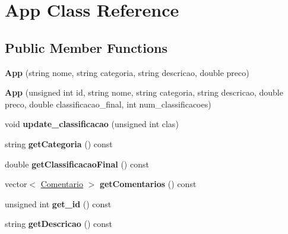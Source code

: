 \hypertarget{class_app}{\section{App Class Reference}
\label{class_app}
}
\subsection*{Public Member Functions}
\begin{DoxyCompactItemize}
\item 
\hypertarget{class_app_ae491b91a0a622aa5f78559403b83e0df}{{\bfseries App} (string nome, string categoria, string descricao, double preco)}\label{class_app_ae491b91a0a622aa5f78559403b83e0df}

\item 
\hypertarget{class_app_a77f4deed2edae59b74f5aca757c1368a}{{\bfseries App} (unsigned int id, string nome, string categoria, string descricao, double preco, double classificacao\+\_\+final, int num\+\_\+classificacoes)}\label{class_app_a77f4deed2edae59b74f5aca757c1368a}

\item 
\hypertarget{class_app_ac720715c2e11bfc218842141b9c6e0d2}{void {\bfseries update\+\_\+classificacao} (unsigned int clas)}\label{class_app_ac720715c2e11bfc218842141b9c6e0d2}

\item 
\hypertarget{class_app_a58076d5e40336d8f1489f49ebcc648ac}{string {\bfseries get\+Categoria} () const }\label{class_app_a58076d5e40336d8f1489f49ebcc648ac}

\item 
\hypertarget{class_app_a99b0df2b556e0d0967af13f37b47178e}{double {\bfseries get\+Classificacao\+Final} () const }\label{class_app_a99b0df2b556e0d0967af13f37b47178e}

\item 
\hypertarget{class_app_a55940da54fefa49300678f6ce87eeb04}{vector$<$ \hyperlink{class_comentario}{Comentario} $>$ {\bfseries get\+Comentarios} () const }\label{class_app_a55940da54fefa49300678f6ce87eeb04}

\item 
\hypertarget{class_app_a5618097d1b98a8482e3b179139d9b8be}{unsigned int {\bfseries get\+\_\+id} () const }\label{class_app_a5618097d1b98a8482e3b179139d9b8be}

\item 
\hypertarget{class_app_a2dcf86011e3b1e8dc8d027f4b4b4b253}{string {\bfseries get\+Descricao} () const }\label{class_app_a2dcf86011e3b1e8dc8d027f4b4b4b253}


\end{DoxyCompactItemize}

